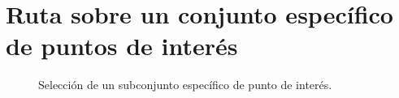 \section[Caso 2]{Ruta sobre un conjunto específico de puntos de interés}
\begin{figure}[H]
	\centering
	\caption{Selección de un subconjunto específico de punto de interés.}
	\label{fig:seleccion_multiple}
\end{figure}
